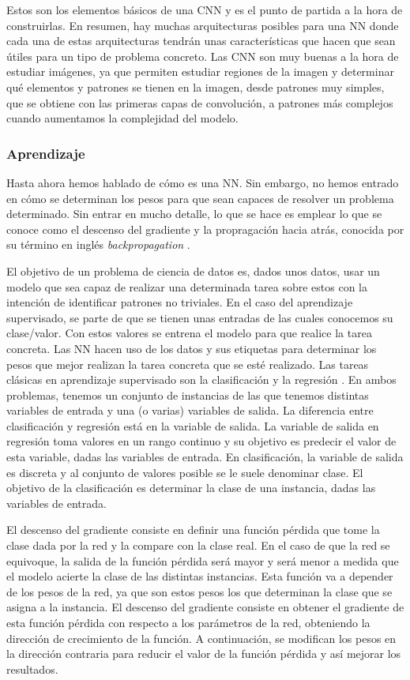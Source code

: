 \documentclass[a4paper,12pt,oneside,titlepage]{book}
\begin{document}
Estos son los elementos básicos de una CNN y es el punto de partida a la hora de construirlas. En resumen, hay muchas arquitecturas posibles para una NN donde cada una de estas arquitecturas tendrán unas características que hacen que sean útiles para un tipo de problema concreto. Las CNN son muy buenas a la hora de estudiar imágenes, ya que permiten estudiar regiones de la imagen y determinar qué elementos y patrones se tienen en la imagen, desde patrones muy simples, que se obtiene con las primeras capas de convolución, a patrones más complejos cuando aumentamos la complejidad del modelo.

\subsubsection*{Aprendizaje}

Hasta ahora hemos hablado de cómo es una NN. Sin embargo, no hemos entrado en cómo se determinan los pesos para que sean capaces de resolver un problema determinado. Sin entrar en mucho detalle, lo que se hace es emplear lo que se conoce como el descenso del gradiente \cite{gradient_descent} y la propragación hacia atrás, conocida por su término en inglés \textit{backpropagation} \cite{backpropa}.

El objetivo de un problema de ciencia de datos es, dados unos datos, usar un modelo que sea capaz de realizar una determinada tarea sobre estos con la intención de identificar patrones no triviales. En el caso del aprendizaje supervisado, se parte de que se tienen unas entradas de las cuales conocemos su clase/valor. Con estos valores se entrena el modelo para que realice la tarea concreta. Las NN hacen uso de los datos y sus etiquetas para determinar los pesos que mejor realizan la tarea concreta que se esté realizado. Las tareas clásicas en aprendizaje supervisado son la clasificación y la regresión \cite{dl_book}. En ambos problemas, tenemos un conjunto de instancias de las que tenemos distintas variables de entrada y una (o varias) variables de salida. La diferencia entre clasificación y regresión está en la variable de salida. La variable de salida en regresión toma valores en un rango continuo y su objetivo es predecir el valor de esta variable, dadas las variables de entrada. En clasificación, la variable de salida es discreta y al conjunto de valores posible se le suele denominar clase. El objetivo de la clasificación es determinar la clase de una instancia, dadas las variables de entrada.  

El descenso del gradiente consiste en definir una función pérdida que tome la clase dada por la red y la compare con la clase real. En el caso de que la red se equivoque, la salida de la función pérdida será mayor y será menor a medida que el modelo acierte la clase de las distintas instancias. Esta función va a depender de los pesos de la red, ya que son estos pesos los que determinan la clase que se asigna a la instancia. El descenso del gradiente consiste en obtener el gradiente de esta función pérdida con respecto a los parámetros de la red, obteniendo la dirección de crecimiento de la función. A continuación, se modifican los pesos en la dirección contraria para reducir el valor de la función pérdida y así mejorar los resultados.
\end{document}
